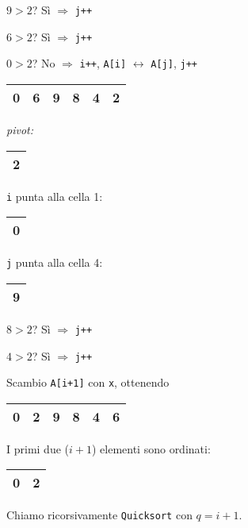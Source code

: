 $9 > 2$? Sì $\Rightarrow$ \texttt{j++} \par
$6 > 2$? Sì $\Rightarrow$ \texttt{j++} \par
$0 > 2$? No $\Rightarrow$ \texttt{i++}, \texttt{A[i]} $\leftrightarrow$ \texttt{A[j]}, \texttt{j++} \par

\begin{center}
	\begin{tabular}{|l|l|l|l|l|l|}
		\hline
		0 & 6 & 9 & 8 & 4 & 2 \\
		\hline
	\end{tabular}
	\hspace{1cm}
	\emph{pivot: }
	\begin{tabular}{|l|}
		\hline
		2 \\
		\hline
	\end{tabular}
\end{center}

\texttt{i} punta alla cella 1: 
\begin{tabular}{|l|}
	\hline
	0 \\
	\hline
\end{tabular} \par
\texttt{j} punta alla cella 4:
\begin{tabular}{|l|}
	\hline
	9 \\
	\hline
\end{tabular}

$8 > 2$? Sì $\Rightarrow$ \texttt{j++} \par
$4 > 2$? Sì $\Rightarrow$ \texttt{j++} \par
Scambio \texttt{A[i+1]} con \texttt{x}, ottenendo \par

\begin{center}
	\begin{tabular}{|l|l|l|l|l|l|}
		\hline
		0 & 2 & 9 & 8 & 4 & 6 \\
		\hline
	\end{tabular}
\end{center}

I primi due ($i+1$) elementi sono ordinati: 
\begin{center}
	\begin{tabular}{|l|l|}
		\hline
		0 & 2 \\
		\hline
	\end{tabular}
\end{center}

Chiamo ricorsivamente \texttt{Quicksort} con $q = i + 1$.


